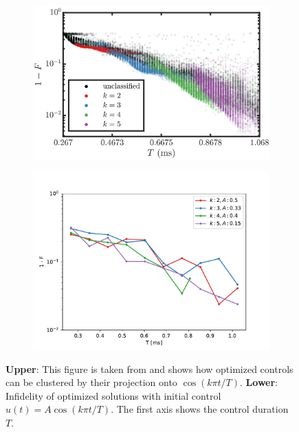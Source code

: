 \documentclass[a4paper, twocolumn]{revtex4-1}
\begin{document}
\begin{figure}
	\begin{subfigure}{0.9\columnwidth}
		\centering
		\includegraphics[width=\columnwidth]{graphics/clustering/QM2Screenshot.png}
	\end{subfigure}
	\begin{subfigure}{\columnwidth}
		\centering
		\includegraphics[width=\columnwidth]{graphics/clustering/QM2Clustering.pdf}
	\end{subfigure}
	\caption{
		\textbf{Upper}: This figure is taken from \cite{QM2Paper} and shows how optimized controls can be clustered by their projection onto $\cos(k\pi t/T)$. \textbf{Lower}: Infidelity of  optimized solutions with initial control $u(t)=A\cos(k\pi t/T)$. The first axis shows the control duration $T$.}
	\label{fig:Clustering}
\end{figure}
\end{document}
